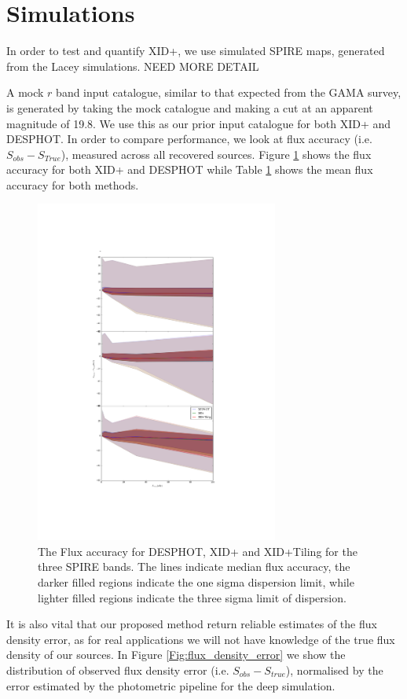 \documentclass[useAMS,usenatbib]{mn2e}
\begin{document}
\section{Simulations}
In order to test and quantify XID+, we use simulated SPIRE maps, generated from the Lacey simulations. NEED MORE DETAIL

A mock $r$ band input catalogue, similar to that expected from the GAMA survey, is generated by taking the mock catalogue and making a cut at an apparent magnitude of 19.8. We use this as our prior input catalogue for both XID+ and DESPHOT. In order to compare performance, we look at flux accuracy (i.e. $S_{obs} - S_{True}$), measured across all recovered sources. Figure \ref{Fig:flux_acc} shows the flux accuracy for both XID+ and DESPHOT while Table \ref{} shows the mean flux accuracy for both methods.

\begin{figure}
\includegraphics[width=8cm]{./Figures/Flux_accuracy}
\caption{The Flux accuracy for DESPHOT, XID+ and XID+Tiling for the three SPIRE bands. The lines indicate median flux accuracy, the darker filled regions indicate the one sigma dispersion limit, while lighter filled regions indicate the three sigma limit of dispersion.}\label{Fig:flux_acc}
\end{figure}

It is also vital that our proposed method return reliable estimates of the flux density error, as for real applications we will not have knowledge of the true flux density of our sources. In Figure \ref{Fig:flux_density_error} we show the distribution of observed flux density error (i.e. $S_{obs}-S_{true}$), normalised by the error estimated by the photometric pipeline for the deep simulation. 
\end{document}
